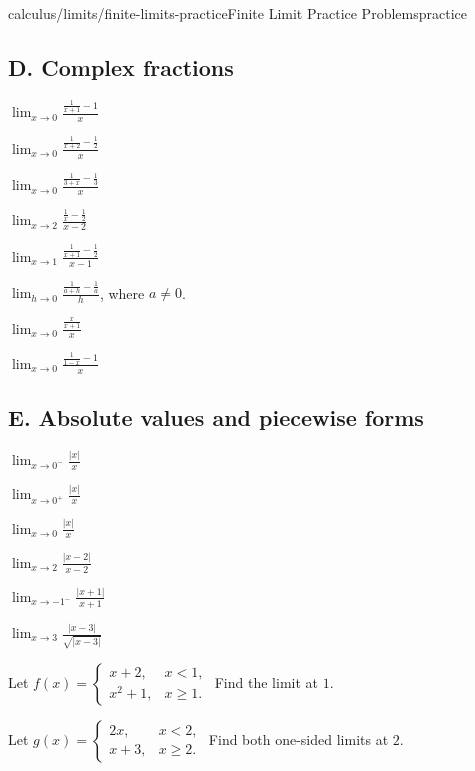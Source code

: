 \begin{webpage}{calculus/limits/finite-limits-practice}{Finite Limit Practice Problems}{practice}
\subsection*{D. Complex fractions}
\begin{bgexercises}[label=\textbf{2.\arabic*},resume]
  \item \(\displaystyle\lim_{x\to0}\frac{\frac1{x+1}-1}{x}\)
  \item \(\displaystyle\lim_{x\to0}\frac{\frac1{x+2}-\frac12}{x}\)
  \item \(\displaystyle\lim_{x\to0}\frac{\frac1{3+x}-\frac13}{x}\)
  \item \(\displaystyle\lim_{x\to2}\frac{\frac1x-\frac12}{x-2}\)
  \item \(\displaystyle\lim_{x\to1}\frac{\frac1{x+1}-\frac12}{x-1}\)
  \item \(\displaystyle\lim_{h\to0}\frac{\frac1{a+h}-\frac1a}{h}\), where \(a\ne0\).
  \item \(\displaystyle\lim_{x\to0}\frac{\frac{x}{x+1}}{x}\)
  \item \(\displaystyle\lim_{x\to0}\frac{\frac1{1-x}-1}{x}\)
\end{bgexercises}

\subsection*{E. Absolute values and piecewise forms}
\begin{bgexercises}[label=\textbf{2.\arabic*},resume]
  \item \(\displaystyle\lim_{x\to0^-}\frac{|x|}{x}\)
  \item \(\displaystyle\lim_{x\to0^+}\frac{|x|}{x}\)
  \item \(\displaystyle\lim_{x\to0}\frac{|x|}{x}\)
  \item \(\displaystyle\lim_{x\to2}\frac{|x-2|}{x-2}\)
  \item \(\displaystyle\lim_{x\to-1^-}\frac{|x+1|}{x+1}\)
  \item \(\displaystyle\lim_{x\to3}\frac{|x-3|}{\sqrt{|x-3|}}\)
  \item Let \(f(x)=\begin{cases}x+2,&x<1,\\x^2+1,&x\ge1.\end{cases}\) Find the limit at \(1\).
  \item Let \(g(x)=\begin{cases}2x,&x<2,\\x+3,&x\ge2.\end{cases}\) Find both one-sided limits at \(2\).
\end{bgexercises}


\end{webpage}

